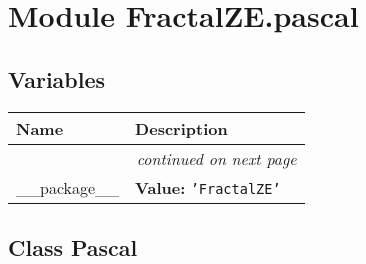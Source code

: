 %
%
%


\section{Module FractalZE.pascal}

    \label{FractalZE:pascal}


  \subsection{Variables}

    \vspace{-1cm}
\hspace{\varindent}\begin{longtable}{|p{\varnamewidth}|p{\vardescrwidth}|l}
\cline{1-2}
\cline{1-2} \centering \textbf{Name} & \centering \textbf{Description}& \\
\cline{1-2}
\endhead\cline{1-2}\multicolumn{3}{r}{\small\textit{continued on next page}}\\\endfoot\cline{1-2}
\endlastfoot\raggedright \_\-\_\-p\-a\-c\-k\-a\-g\-e\-\_\-\_\- & \raggedright \textbf{Value:} 
{\tt \texttt{'}\texttt{FractalZE}\texttt{'}}&\\
\cline{1-2}
\end{longtable}



\subsection{Class Pascal}


